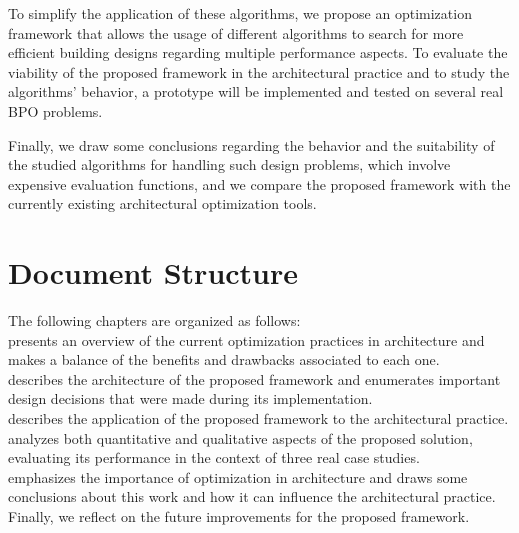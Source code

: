 To simplify the application of these algorithms, we propose an optimization framework that allows the usage of different algorithms to search for more efficient building designs regarding multiple performance aspects. To evaluate the viability of the proposed framework in the architectural practice and to study the algorithms' behavior, a prototype will be implemented and tested on several real \ac{BPO} problems. 

Finally, we draw some conclusions regarding the behavior and the suitability of the studied algorithms for handling such design problems, which involve expensive evaluation functions, and we compare the proposed framework with the currently existing architectural optimization tools.

\section{Document Structure}
The following chapters are organized as follows: \\ 
\textbf{} presents an overview of the current optimization practices in architecture and makes a balance of the benefits and drawbacks associated to each one.  \\
\textbf{} describes the architecture of the proposed framework and enumerates important design decisions that were made during its implementation. \\
\textbf{} describes the application of the proposed framework to the architectural practice. \\
\textbf{} analyzes both quantitative and qualitative aspects of the proposed solution, evaluating its performance in the context of three real case studies. \\
\textbf{} emphasizes the importance of optimization in architecture and draws some conclusions about this work and how it can influence the architectural practice. Finally, we reflect on the future improvements for the proposed framework. \\
